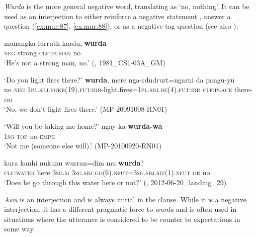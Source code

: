 \documentclass[output=paper,colorlinks,citecolor=brown]{langscibook}
\begin{document}
\textit{Wurda} is the more general negative word, translating as ‘no, nothing’. It can be used as an interjection to either reinforce a negative statement , answer a question (\ref{ex:mur:87}, \ref{ex:mur:88}), or as a negative tag question  (see also ): 

\ea\label{ex:mur:86}
    \gll manangka lurruth kardu, \textbf{wurda}\\
         \textsc{neg} strong \textsc{clf:human} no\\
    \glt ‘He’s not a strong man, no.’ (\citealt{MansfieldEtAl2019}, 1981\_CS1-03A\_GM)
\z 

\newpage
\ea\label{ex:mur:87} 
    \begin{xlist}[Q: ]
    \label{ex:mur:87A}
        \glt ‘Do you light fires there?’ 
    \label{ex:mur:87B}
        \gll \textbf{wurda}, mere nga-rdudrurt=ngarni da pangu-yu\\
              no \textsc{neg} \textsc{1pl.sbj.poke(19).fut:irr-}light.fires=\textsc{1pl.sbj.be(4).fut:irr} \textsc{clf:place} there-\textsc{dm}\\
        \glt ‘No, we don’t light fires there.’ (MP-20091008-RN01)
    \end{xlist}
\z 

\ea\label{ex:mur:88}
    \begin{xlist}[Q: ]
    \label{ex:mur:88A}
        \glt ‘Will you be taking me home?’ 
    \label{ex:mur:88B}
        \gll ngay-ka \textbf{wurda-wa}\\
             \textsc{1sg-top} no-\textsc{emph}\\
        \glt ‘Not me (someone else will).’ (MP-20100920-RN01)
    \end{xlist}
\z 

\ea\label{ex:mur:89}
    \gll kura kanhi nukunu wurran=dim mu \textbf{wurda}?\\
         \textsc{clf:water} here \textsc{3sg.m} \textsc{3sg.sbj.go(6).nfut=3sg.sbj.sit(1).nfut} \textsc{or} no\\
    \glt ‘Does he go through this water here or not?’ (\citealt{MansfieldEtAl2019}, 2012-06-20\_landing\_29)
\z 

\textit{Awu} is an interjection and is always initial in the clause. While it is a negative interjection, it has a different pragmatic force to \textit{wurda} and is often used in situations where the utterance is considered to be counter to expectations in some way. 
\end{document}
